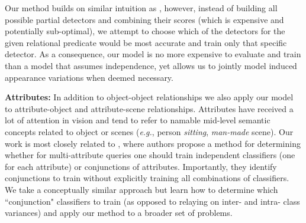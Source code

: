 \documentclass[runningheads]{llncs}
\makeatletter
\newcommand*{\eg}{{\em e.g.}\@\xspace}
\makeatother
\begin{document}
Our method builds on similar intuition as \cite{Sadeghi2015}, however, instead of building all possible partial detectors and combining their scores (which is expensive and potentially sub-optimal), we attempt to choose which of the detectors for the given relational predicate 
would be most accurate and train only that specific detector. As a consequence, our model is no more expensive to evaluate and train than a model that assumes independence,
yet allows us to jointly model induced appearance variations when deemed necessary. 

\vspace{0.05in}
\noindent
{\bf Attributes:}  In addition to object-object relationships we also apply our model to attribute-object and attribute-scene relationships. Attributes have received a lot of attention in vision \cite{Farhadi2009,Lampert2013} and tend to refer to namable mid-level semantic concepts 
related to object or scenes (\eg, person {\em sitting}, {\em man-made} scene). Our work is most closely related 
to \cite{Rastegari2013}, where authors propose a method for determining whether for multi-attribute queries one should train independent classifiers (one for each attribute) or conjunctions of attributes. Importantly, they identify conjunctions to train without explicitly training all combinations of classifiers. We take a conceptually similar approach but learn how to determine which ``conjunction" classifiers to train (as opposed to relaying on inter- and intra- class variances) and apply our method to a broader set of problems. %






\vspace{-0.05in}
\end{document}
